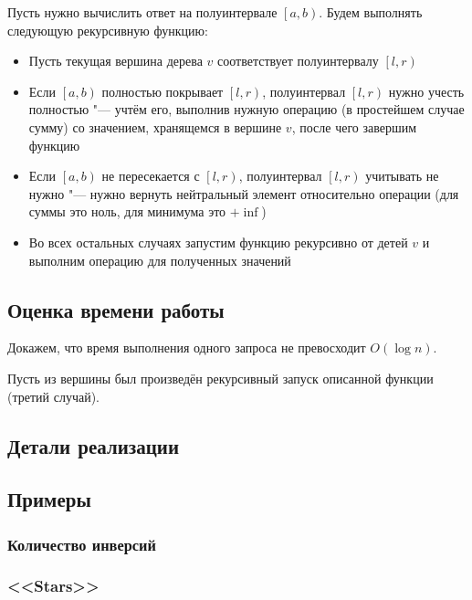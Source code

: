 \documentclass[a4paper,12pt]{article}
\begin{document}
    Пусть нужно вычислить ответ на полуинтервале
    $\left[a, b\right)$. Будем выполнять следующую
    рекурсивную функцию:
    \begin{itemize}
      \item Пусть текущая вершина дерева $v$ соответствует
        полуинтервалу $\left[l, r\right)$
      \item Если $\left[a, b\right)$ полностью покрывает
        $\left[l, r\right)$, полуинтервал
        $\left[l, r\right)$ нужно учесть полностью "---
        учтём его, выполнив нужную операцию (в простейшем
        случае сумму) со значением, хранящемся в вершине $v$,
        после чего завершим функцию
      \item Если $\left[a, b\right)$ не пересекается с
        $\left[l, r\right)$, полуинтервал
        $\left[l, r\right)$ учитывать не нужно "---
        нужно вернуть нейтральный элемент относительно
        операции (для суммы это ноль, для минимума это
        $+\inf$)
      \item Во всех остальных случаях запустим функцию
        рекурсивно от детей $v$ и выполним операцию для
        полученных значений
    \end{itemize}

    \subsection{Оценка времени работы}

    Докажем, что время выполнения одного запроса не
    превосходит $O(\log n)$.

    Пусть из вершины был произведён рекурсивный запуск
    описанной функции (третий случай).

    \subsection{Детали реализации}

    \subsection{Примеры}
      \subsubsection{Количество инверсий}
      \subsubsection{<<Stars>>}
\end{document}
